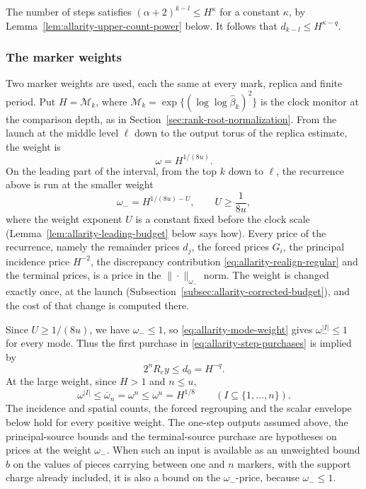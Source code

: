 The number of steps satisfies $(\alpha+2)^{k-l}\le H^{\kappa}$ for a
constant $\kappa$, by Lemma~\ref{lem:allarity-upper-count-power} below.
It follows that $d_{k-l}\le H^{\kappa-q}$.

\subsubsection*{The marker weights}
Two marker weights are used, each the same at every mark, replica and
finite period. Put $H=\mathcal M_k$, where
$\mathcal M_k=\exp\{(\log\log\widehat\beta_k)^2\}$ is the clock monitor
at the comparison depth, as in Section~\ref{sec:rank-root-normalization}.
From the launch at the middle level $\ell$ down to the output torus of
the replica estimate, the weight is
\begin{equation}\label{eq:allarity-marker-weight}
 \omega=H^{1/(8u)} .
\end{equation}
On the leading part of the interval, from the top $k$ down to $\ell$,
the recurrence above is run at the smaller weight
\begin{equation}\label{eq:allarity-upper-weight}
 \omega_-=H^{1/(8u)-U},\qquad U\ge\frac1{8u},
\end{equation}
where the weight exponent $U$ is a constant fixed before the clock scale
(Lemma~\ref{lem:allarity-leading-budget} below says how). Every price
of the recurrence, namely the remainder prices $d_j$, the forced prices
$G_i$, the principal incidence price $H^{-2}$, the discrepancy
contribution \eqref{eq:allarity-realign-regular} and the terminal
prices, is a price in the $\|\cdot\|_{\omega_-}$ norm. The weight is
changed exactly once, at the launch
(Subsection~\ref{subsec:allarity-corrected-budget}), and the cost of
that change is computed there.

Since $U\ge1/(8u)$, we have $\omega_-\le1$, so
\eqref{eq:allarity-mode-weight} gives $\omega_-^{|I|}\le1$ for every
mode. Thus the first purchase in \eqref{eq:allarity-step-purchases} is
implied by
\begin{equation}\label{eq:allarity-weighted-discrepancy}
 2^nR_ey\le d_0=H^{-q}.
\end{equation}
At the large weight, since $H>1$ and $n\le u$,
\begin{equation}\label{eq:allarity-weight-cap}
 \omega^{|I|}\le\bar\omega_n=\omega^n\le\omega^u=H^{1/8}
 \qquad (I\subseteq\{1,\ldots,n\}).
\end{equation}
The incidence and spatial counts, the forced regrouping and the scalar
envelope below hold for every positive weight. The one-step outputs
assumed above, the principal-source bounds and the terminal-source
purchase are hypotheses on prices at the weight $\omega_-$. When such an
input is available as an unweighted bound $b$ on the values of pieces
carrying between one and $n$ markers, with the support charge already
included, it is also a bound on the $\omega_-$-price, because
$\omega_-\le1$.

